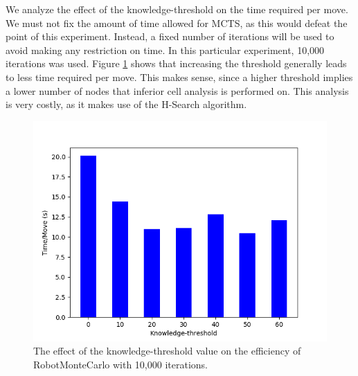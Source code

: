 We analyze the effect of the knowledge-threshold on the time required per move. We must not fix the amount of time allowed for MCTS, as this would defeat the point of this experiment. Instead, a fixed number of iterations will be used to avoid making any restriction on time. In this particular experiment, 10,000 iterations was used. Figure \ref{fig:mc_knowledge_time} shows that increasing the threshold generally leads to less time required per move. This makes sense, since a higher threshold implies a lower number of nodes that inferior cell analysis is performed on. This analysis is very costly, as it makes use of the H-Search algorithm.   
\begin{figure}
    \centering
    \includegraphics[scale = 0.6]{images/MCKNOWLEDGE_TIME_INF.png}
    \caption{The effect of the knowledge-threshold value on the efficiency of RobotMonteCarlo with 10,000 iterations.}
    \label{fig:mc_knowledge_time}
\end{figure}
